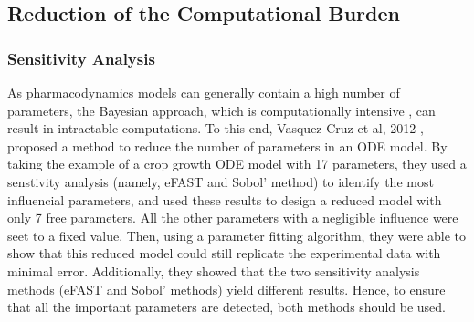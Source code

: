 \documentclass[11pt]{article}
\newcommand*\dif{\mathop{}\!\mathrm{d}}
\begin{document}




\subsection{Reduction of the Computational Burden}
\subsubsection{Sensitivity Analysis}
As pharmacodynamics models can generally contain a high number of parameters, the Bayesian approach, which is computationally intensive \cite{revParamEst}, can result in intractable computations. To this end, Vasquez-Cruz et al, 2012 \cite{tomgro}, proposed a method to reduce the number of parameters in an ODE model. By taking the example of a crop growth ODE model with 17 parameters, they used a senstivity analysis (namely, eFAST and Sobol' method) to identify the most influencial parameters, and used these results to design a reduced model with only 7 free parameters. All the other parameters with a negligible influence were seet to a fixed value. Then, using a parameter fitting algorithm, they were able to show that this reduced model could still replicate the experimental data with minimal error. Additionally, they showed that the two sensitivity analysis methods (eFAST and Sobol' methods) yield different results. Hence, to ensure that all the important parameters are detected, both methods should be used.
\end{document}
